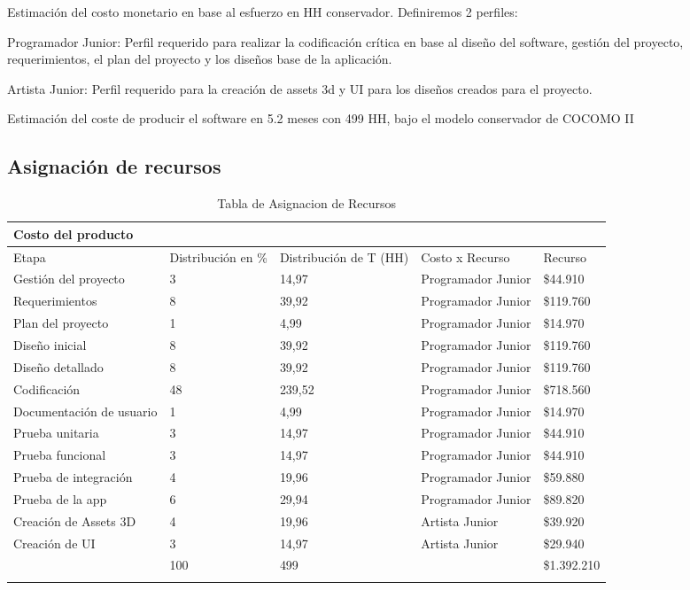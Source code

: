 Estimación del costo monetario en base al esfuerzo en HH conservador. Definiremos 2 perfiles:

Programador Junior: Perfil requerido para realizar la codificación crítica en base al diseño del software, gestión del proyecto, requerimientos, el plan del proyecto y los diseños base de la aplicación.

Artista Junior: Perfil requerido para la creación de assets 3d y UI para los diseños creados para el proyecto.

Estimación del coste de producir el software en 5.2 meses con 499 HH, bajo el modelo conservador de COCOMO II 

\subsection{Asignación de recursos}

\begin{longtable}{|p{4cm}|p{2.2cm}|p{2.4cm}|p{2.7cm}|p{2cm}|}
\hline 
Costo del producto  &   &   &   &   \\ 
\hline 
Etapa    & Distribución en \% & Distribución de T (HH) & Costo x Recurso & Recurso \\ 
\hline 
Gestión del proyecto & 3 & 14,97 & Programador Junior & \$44.910 \\ 
\hline 
Requerimientos & 8 & 39,92 & Programador Junior & \$119.760 \\ 
\hline 
Plan del proyecto & 1 & 4,99 & Programador Junior & \$14.970 \\ 
\hline 
Diseño inicial & 8 & 39,92 & Programador Junior & \$119.760 \\ 
\hline 
Diseño detallado & 8 & 39,92 & Programador Junior & \$119.760 \\ 
\hline 
Codificación & 48 & 239,52 & Programador Junior & \$718.560 \\ 
\hline 
Documentación de usuario & 1 & 4,99 & Programador Junior & \$14.970 \\ 
\hline 
Prueba unitaria & 3 & 14,97 & Programador Junior & \$44.910 \\ 
\hline 
Prueba funcional & 3 & 14,97 & Programador Junior & \$44.910 \\ 
\hline 
Prueba de integración & 4 & 19,96 & Programador Junior & \$59.880 \\ 
\hline 
Prueba de la app & 6 & 29,94 & Programador Junior & \$89.820 \\ 
\hline 
Creación de Assets 3D & 4 & 19,96 & Artista Junior & \$39.920 \\ 
\hline 
Creación de UI & 3 & 14,97 & Artista Junior & \$29.940 \\ 
\hline 
  & 100 & 499 &   & \$1.392.210 \\ 
\hline 
\caption{Tabla de Asignacion de Recursos}
\label{tab16}
\end{longtable} 



